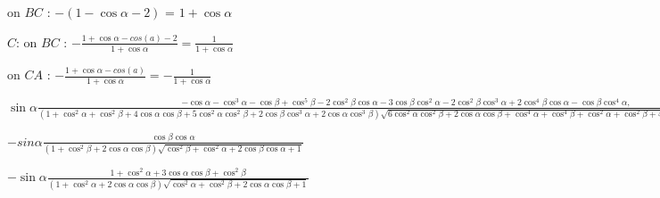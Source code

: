 \documentclass[a4paper,10pt]{article}
\begin{document}
on $BC$ : $-\left(1 - \cos{\alpha} - 2\right)$ =  $1 + \cos{\alpha}$

\noindent $C$: 
on $BC$ : $-\frac{1 + \cos{\alpha} - cos\left(a\right) - 2}{1 + \cos{\alpha}} = \frac{1}{1 + \cos{\alpha}}$

on $CA$ : $-\frac{1 + \cos{\alpha} - cos\left(a\right)    }{1 + \cos{\alpha}} = -\frac{1}{1 + \cos{\alpha}}$


\noindent$\sin{\alpha}
      \frac{
        -\cos{\alpha} - \cos^{3}{\alpha} - \cos{\beta} + \cos^{5}{\beta} - 2\cos^{2}{\beta}\cos{\alpha} - 3\cos{\beta}\cos^{2}{\alpha} - 2\cos^{2}{\beta}\cos^{3}{\alpha} + 2\cos^{4}{\beta}\cos{\alpha} - \cos{\beta}\cos^{4}{\alpha},
      }{
         \left(  1 + \cos^{2}{\alpha} + \cos^{2}{\beta} + 4\cos{\alpha}\cos{\beta} + 5 \cos^{2}{\alpha}\cos^{2}{\beta} + 2  \cos{\beta} \cos^{3}{\alpha} + 2\cos{\alpha}\cos^{3}{\beta}\right)
          \sqrt{6\cos^{2}{\alpha}\cos^{2}{\beta} + 2\cos{\alpha}\cos{\beta} + \cos^{4}{\alpha} + \cos^{4}{\beta} + \cos^{2}{\alpha} + \cos^{2}{\beta} + 4\cos^{3}{\alpha}\cos{\beta} + 4\cos{\alpha}\cos^{3}{\beta}}
      } + $

\noindent$-sin{\alpha}
      \frac{
        \cos{\beta}  \cos{\alpha}
      }{
        \left( 1 + \cos^{2}{\beta} + 2\cos{\alpha}\cos{\beta} \right)
        \sqrt{ \cos^{2}{\beta} + \cos^{2}{\alpha} + 2  \cos{\beta}  \cos{\alpha} + 1 }
      }
$
      
\noindent$-\sin{\alpha}
      \frac{
        1 + \cos^{2}{\alpha} + 3\cos{\alpha}\cos{\beta}  + \cos^{2}{\beta}
      }{
       \left(  1 + \cos^{2}{\alpha} + 2\cos{\alpha}\cos{\beta} \right)
        \sqrt{ \cos^{2}{\alpha} + \cos^{2}{\beta} + 2  \cos{\alpha}  \cos{\beta} + 1 }
      }
$
\end{document}
